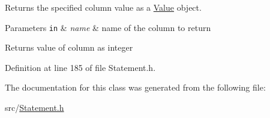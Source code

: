 Returns the specified column value as a \hyperlink{a00015}{Value} object. 


\begin{DoxyParams}[1]{Parameters}
\mbox{\tt in}  & {\em name} & name of the column to return \\
\hline
\end{DoxyParams}
\begin{DoxyReturn}{Returns}
value of column as integer 
\end{DoxyReturn}


Definition at line 185 of file Statement.\-h.



The documentation for this class was generated from the following file\-:\begin{DoxyCompactItemize}
\item 
src/\hyperlink{a00032}{Statement.\-h}\end{DoxyCompactItemize}

